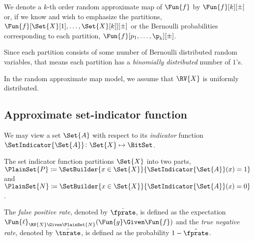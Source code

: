 \documentclass[ ../main.tex]{subfiles}
\begin{document}
We denote a $k$-th order random approximate map of $\Fun{f}$ by $\Fun{f}[k][\pm]$ or, if we know and wish to emphasize the partitions, $\Fun{f}[\Set{X}[1],\ldots,\Set{X}[k]][\pm]$ or the Bernoulli probabilities corresponding to each partition, $\Fun{f}[p_1,\ldots,\p_k][\pm]$.



Since each partition consists of some number of Bernoulli distributed random variables, that means each partition has a \emph{binomially distributed} number of $1$'s.






In the random approximate map model, we assume that $\RV{X}$ is uniformly distributed.


\subsection{Approximate set-indicator function}
We may view a set $\Set{A}$ with respect to its \emph{indicator} function $\SetIndicator{\Set{A}} \colon \Set{X} \mapsto \BitSet$.

The set indicator function partitions $\Set{X}$ into two parts, $\PlainSet{P} \coloneqq \SetBuilder{x \in \Set{X}}{\SetIndicator{\Set{A}}(x) = 1}$ and $\PlainSet{N} \coloneqq \SetBuilder{x \in \Set{X}}{\SetIndicator{\Set{A}}(x) = 0}$.




\begin{definition}
\label{def:fpr}
The \emph{false positive rate}, denoted by $\hat{\fprate}$, is defined as the expectation $\Fun{\ell}_{\RV{X} \Given \PlainSet{N}}(\Fun{g} \Given \Fun{f})$ and the \emph{true negative rate}, denoted by $\hat{\tnrate}$, is defined as the probability $1-\hat{\fprate}$.
\end{definition}
\end{document}
